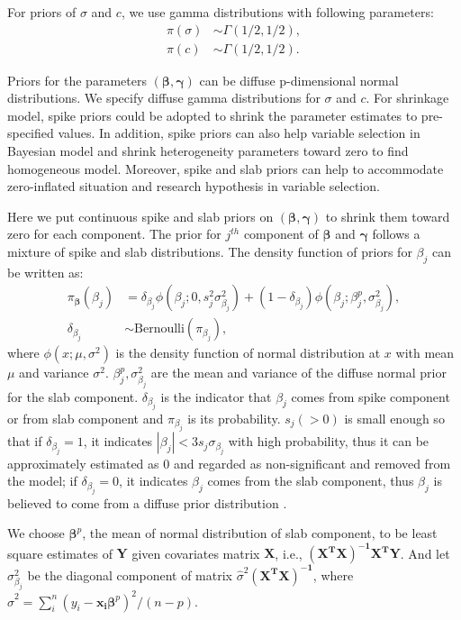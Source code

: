 \documentclass[12pt]{article}
\begin{document}
For priors of $\sigma$ and $c$, we use gamma distributions with
following parameters:
\begin{align*}
  \pi(\sigma) & \sim \Gamma (1/2, 1/2), \\
  \pi(c) & \sim \Gamma(1/2, 1/2).
\end{align*}

Priors for the parameters $(\bm{\beta}, \bm{\gamma})$ can be diffuse
p-dimensional normal distributions. We specify diffuse gamma
distributions for $\sigma$ and $c$. For shrinkage model, spike priors
could be adopted to shrink the parameter estimates to pre-specified
values. In addition, spike priors can also help variable selection in
Bayesian model and shrink heterogeneity parameters toward zero to find
homogeneous model. Moreover, spike and slab priors can help to
accommodate zero-inflated situation and research hypothesis in
variable selection.

Here we put continuous spike and slab priors on $(\bm \beta, \bm
\gamma)$ to shrink them toward zero for each component. The prior for
$j^{th}$ component of $\bm \beta$ and $\bm \gamma$ follows a mixture
of spike and slab distributions.  The density function of priors for
$\beta_j$ can be written as:
\begin{align*}
  \pi_{\bm \beta} (\beta_j) &= \delta_{\beta_j} \phi(\beta_j; 0, s_j^2
  \sigma_{\beta_j}^2) +
  (1- \delta_{\beta_j}) \phi(\beta_j; \beta_j^p, \sigma_{\beta_j}^2),\\
  \delta_{\beta_j} & \sim \mbox{Bernoulli} (\pi_{\beta_j}),
\end{align*}
where $\phi(x; \mu, \sigma^2)$ is the density function of normal
distribution at $x$ with mean $\mu$ and variance
$\sigma^2$. $\beta_j^p, \sigma_{\beta_j}^2$ are the mean and variance
of the diffuse normal prior for the slab component.
$\delta_{\beta_j}$ is the indicator that $\beta_j$ comes from spike
component or from slab component and $\pi_{\beta_j}$ is its
probability.  $s_j (>0)$ is small enough so that if $\delta_{\beta_j}
= 1$, it indicates $|\beta_j | < 3 s_j\sigma_{\beta_j}$ with high
probability, thus it can be approximately estimated as 0 and regarded
as non-significant and removed from the model; if $\delta_{\beta_j} =
0$, it indicates $\beta_j$ comes from the slab component, thus
$\beta_j$ is believed to come from a diffuse prior distribution
\citep{george1993}.

We choose $\bm \beta^p$, the mean of normal distribution of slab
component, to be least square estimates of $\bm Y$ given covariates
matrix $\bm X$, i.e., $\bm{(X^TX)^{-1}X^TY}$. And let
$\sigma_{\beta_j}^2$ be the diagonal component of matrix
$\hat{\sigma}^2 \bm{(X^TX)^{-1}}$, where $\hat{\sigma}^2 = \sum_i^n
(y_i - \bm{x_i\beta}^p)^2/(n - p)$.
\end{document}
